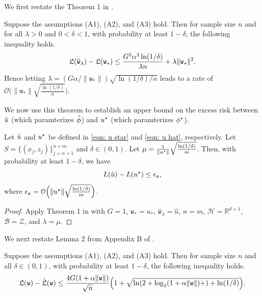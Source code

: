 We first restate the Theorem 1 in \cite{della2021regularized}.
\begin{lem}
Suppose the assumptions (A1), (A2), and (A3) hold.  Then for sample size $n$ and for all $\lambda > 0$ and $0 < \delta < 1$, with probability at least $1 - \delta$, the following inequality holds.
        \begin{equation*}
        \mathfrak{L}(\widehat{\mathtt{w}}_\lambda) - \mathfrak{L}(\mathtt{w}_*) \leq \frac{G^2\alpha^2 \ln(1/\delta)}{\lambda n} + \lambda \|\mathtt{w}_*\|^2.
    \end{equation*}
Hence letting $\lambda = (G\alpha/\|\mathtt{w}_*\|)\sqrt{\ln(1/\delta)/n}$ leads to a rate of $\mathcal{O}\Big(\|\mathtt{w}_*\|\sqrt{\frac{\ln(1/\delta)}{n}}\Big)$.
\end{lem}

We now use this theorem to establish an upper bound on the excess risk between $\hat{u}$ (which paramterizes $\hat{\phi}$) and $u^\star$ (which paramterizes
 $\phi^\star$).

\begin{lem}\label{lem: learning theory on X,Z}
    Let $\hat{u}$ and $u^\star$ be defined in \eqref{eqn: u star} and \eqref{eqn: u hat}, respectively. Let $S = \{(x_j, z_j)\}_{j=n+1}^{n+m}$ and $\delta \in (0,1)$. Let $\mu = \frac{1}{\|u^\star\|}\sqrt{\frac{\ln(1/\delta)}{m}}$. Then, with probability at least $1-\delta$, we have
    \begin{equation}\label{eqn: rhs eps}
        L(\hat{u}) - L(u^\star) \leq \epsilon_{\mathfrak{u}}, 
    \end{equation}
    where $\epsilon_{\mathfrak{u}} = \mathcal{O}\Big(\|u^\star\|\sqrt{\frac{\ln(1/\delta)}{m}}\Big)$.
\end{lem}

\begin{proof}
Apply Theorem 1 in \cite{della2021regularized} with $G = 1$, $\mathtt{w}_* = u_*$, $\widehat{\mathtt{w}}_\lambda = \widehat{u}$, $n = m$, $\mathcal{H} = \mathbb{R}^{d+1}$, $\mathcal{B} = \mathcal{Z}$, and $\lambda = \mu$.
\end{proof}

We next restate Lemma 2 from Appendix B of \cite{della2021regularized}.
\begin{lem} Suppose the assumptions (A1), (A2), and (A3) hold. Then for sample size $n$ and all $\delta \in (0,1)$, with probability at least $1 - \delta$, the following ineqaulity holds.
\begin{equation*}
    \mathfrak{L}(\mathtt{w}) - \hat{\mathfrak{L}}(\mathtt{w}) \leq  \frac{4G(1+\alpha\|\mathtt{w}\|)}{\sqrt{n}}\Big(1 + \sqrt{\ln(2+\log_2(1+\alpha\|\mathtt{w}\|) +) + \ln(1/\delta)}\Big).
\end{equation*}
\end{lem}

